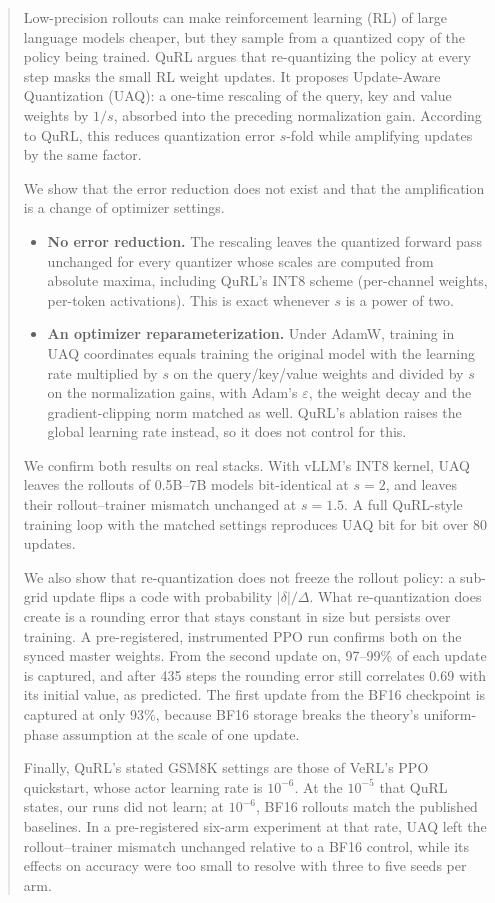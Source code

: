 \begin{abstract}
Low-precision rollouts can make reinforcement learning (RL) of large language models cheaper, but they sample from a quantized copy of the policy being trained. QuRL \citep{li2026qurl} argues that re-quantizing the policy at every step masks the small RL weight updates. It proposes Update-Aware Quantization (UAQ): a one-time rescaling of the query, key and value weights by $1/s$, absorbed into the preceding normalization gain. According to QuRL, this reduces quantization error $s$-fold while amplifying updates by the same factor.

We show that the error reduction does not exist and that the amplification is a change of optimizer settings.
\begin{itemize}[leftmargin=*,itemsep=1pt,topsep=2pt]
\item \textbf{No error reduction.} The rescaling leaves the quantized forward pass unchanged for every quantizer whose scales are computed from absolute maxima, including QuRL's INT8 scheme (per-channel weights, per-token activations). This is exact whenever $s$ is a power of two.
\item \textbf{An optimizer reparameterization.} Under AdamW, training in UAQ coordinates equals training the original model with the learning rate multiplied by $s$ on the query/key/value weights and divided by $s$ on the normalization gains, with Adam's $\varepsilon$, the weight decay and the gradient-clipping norm matched as well. QuRL's ablation raises the global learning rate instead, so it does not control for this.
\end{itemize}

We confirm both results on real stacks. With vLLM's INT8 kernel, UAQ leaves the rollouts of 0.5B--7B models bit-identical at $s=2$, and leaves their rollout--trainer mismatch unchanged at $s=1.5$. A full QuRL-style training loop with the matched settings reproduces UAQ bit for bit over 80 updates.

We also show that re-quantization does not freeze the rollout policy: a sub-grid update flips a code with probability $|\delta|/\Delta$. What re-quantization does create is a rounding error that stays constant in size but persists over training. A pre-registered, instrumented PPO run confirms both on the synced master weights. From the second update on, 97--99\% of each update is captured, and after 435 steps the rounding error still correlates 0.69 with its initial value, as predicted. The first update from the BF16 checkpoint is captured at only 93\%, because BF16 storage breaks the theory's uniform-phase assumption at the scale of one update.

Finally, QuRL's stated GSM8K settings are those of VeRL's PPO quickstart, whose actor learning rate is $10^{-6}$. At the $10^{-5}$ that QuRL states, our runs did not learn; at $10^{-6}$, BF16 rollouts match the published baselines. In a pre-registered six-arm experiment at that rate, UAQ left the rollout--trainer mismatch unchanged relative to a BF16 control, while its effects on accuracy were too small to resolve with three to five seeds per arm.
\end{abstract}
